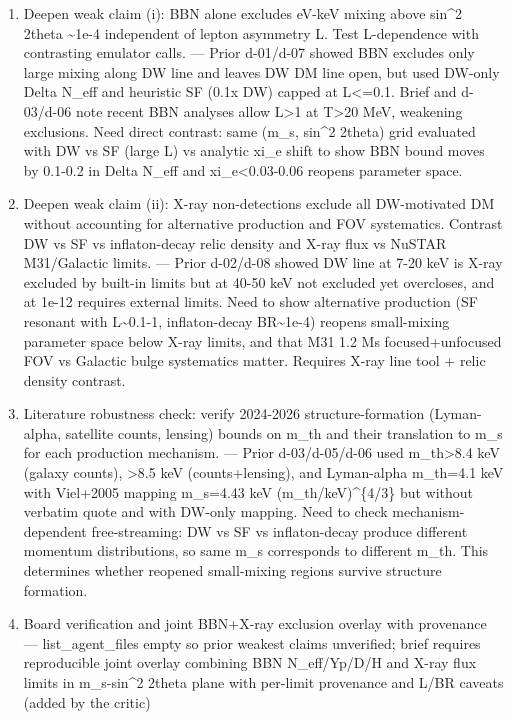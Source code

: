 \documentclass[11pt,a4paper]{article}
\begin{document}
\begin{enumerate}
  \item Deepen weak claim (i): BBN alone excludes eV-keV mixing above sin\textasciicircum{}2 2theta \textasciitilde{}1e-4 independent of lepton asymmetry L. Test L-dependence with contrasting emulator calls. --- Prior d-01/d-07 showed BBN excludes only large mixing along DW line and leaves DW DM line open, but used DW-only Delta N\_eff and heuristic SF (0.1x DW) capped at L\textless{}=0.1. Brief and d-03/d-06 note recent BBN analyses allow L\textgreater{}1 at T\textgreater{}20 MeV, weakening exclusions. Need direct contrast: same (m\_s, sin\textasciicircum{}2 2theta) grid evaluated with DW vs SF (large L) vs analytic xi\_e shift to show BBN bound moves by 0.1-0.2 in Delta N\_eff and \textbar{}xi\_e\textbar{}\textless{}0.03-0.06 reopens parameter space.
  \item Deepen weak claim (ii): X-ray non-detections exclude all DW-motivated DM without accounting for alternative production and FOV systematics. Contrast DW vs SF vs inflaton-decay relic density and X-ray flux vs NuSTAR M31/Galactic limits. --- Prior d-02/d-08 showed DW line at 7-20 keV is X-ray excluded by built-in limits but at 40-50 keV not excluded yet overcloses, and at 1e-12 requires external limits. Need to show alternative production (SF resonant with L\textasciitilde{}0.1-1, inflaton-decay BR\textasciitilde{}1e-4) reopens small-mixing parameter space below X-ray limits, and that M31 1.2 Ms focused+unfocused FOV vs Galactic bulge systematics matter. Requires X-ray line tool + relic density contrast.
  \item Literature robustness check: verify 2024-2026 structure-formation (Lyman-alpha, satellite counts, lensing) bounds on m\_th and their translation to m\_s for each production mechanism. --- Prior d-03/d-05/d-06 used m\_th\textgreater{}8.4 keV (galaxy counts), \textgreater{}8.5 keV (counts+lensing), and Lyman-alpha m\_th=4.1 keV with Viel+2005 mapping m\_s=4.43 keV (m\_th/keV)\textasciicircum{}\{4/3\} but without verbatim quote and with DW-only mapping. Need to check mechanism-dependent free-streaming: DW vs SF vs inflaton-decay produce different momentum distributions, so same m\_s corresponds to different m\_th. This determines whether reopened small-mixing regions survive structure formation.
  \item Board verification and joint BBN+X-ray exclusion overlay with provenance --- list\_agent\_files empty so prior weakest claims unverified; brief requires reproducible joint overlay combining BBN N\_eff/Yp/D/H and X-ray flux limits in m\_s-sin\textasciicircum{}2 2theta plane with per-limit provenance and L/BR caveats (added by the critic)

\end{enumerate}
\end{document}
